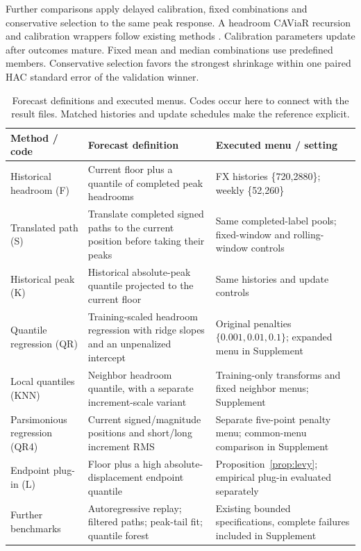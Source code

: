 \documentclass[11pt,a4paper]{article}
\begin{document}
Further comparisons apply delayed calibration, fixed combinations and conservative selection to the same peak response. A headroom CAViaR recursion and calibration wrappers follow existing methods \citep{engle2004,gibbs2021}. Calibration parameters update after outcomes mature. Fixed mean and median combinations use predefined members. Conservative selection favors the strongest shrinkage within one paired HAC standard error of the validation winner.

\begin{table}[htbp]\centering\small
\caption{Forecast definitions and executed menus. Codes occur here to connect with the result files. Matched histories and update schedules make the reference explicit.}\label{tab:methods}
\begin{tabular}{>{\raggedright\arraybackslash}p{2.9cm}>{\raggedright\arraybackslash}p{6.0cm}>{\raggedright\arraybackslash}p{5.3cm}}\toprule
Method / code & Forecast definition & Executed menu / setting\\\midrule
Historical headroom (F) & Current floor plus a quantile of completed peak headrooms & FX histories \{720,2880\}; weekly \{52,260\}\\
Translated path (S) & Translate completed signed paths to the current position before taking their peaks & Same completed-label pools; fixed-window and rolling-window controls\\
Historical peak (K) & Historical absolute-peak quantile projected to the current floor & Same histories and update controls\\
Quantile regression (QR) & Training-scaled headroom regression with ridge slopes and an unpenalized intercept & Original penalties $\{0.001,0.01,0.1\}$; expanded menu in Supplement\\
Local quantiles (KNN) & Neighbor headroom quantile, with a separate increment-scale variant & Training-only transforms and fixed neighbor menus; Supplement\\
Parsimonious regression (QR4) & Current signed/magnitude positions and short/long increment RMS & Separate five-point penalty menu; common-menu comparison in Supplement\\
Endpoint plug-in (L) & Floor plus a high absolute-displacement endpoint quantile & Proposition~\ref{prop:levy}; empirical plug-in evaluated separately\\
Further benchmarks & Autoregressive replay; filtered paths; peak-tail fit; quantile forest & Existing bounded specifications, complete failures included in Supplement\\

\end{tabular}
\end{table}
\end{document}
